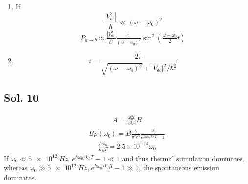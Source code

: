 \begin{enumerate}
\begin{align*}
               & =\frac{4\hbar^2}{|V_{ab}|^2}
              \left[\frac{-(\omega-\omega_0)^2}{4\omega_r} + \omega_r\right]^2
              \sin^2(\omega_r t) \\
               & =
              \frac{4\hbar^2}{|V_{ab}|^2}
              \left[\frac{4(\omega-\omega_0)^4}{16
                          [(\omega-\omega_0)^2 + |V_{ab}|^2/\hbar^2]} +
                  \frac{1}{4}
                  [(\omega-\omega_0)^2 + |V_{ab}|^2/\hbar^2]
                  -\frac{1}{2}(\omega-\omega_0)^2\right]
              \sin^2(\omega_r t)
              \\
               & =
              \frac{\hbar^2}{|V_{ab}|^2}
              \left[\frac{(\omega-\omega_0)^4}{
                      [(\omega-\omega_0)^2 + |V_{ab}|^2/\hbar^2]} +
                  |V_{ab}|^2/\hbar^2
                  -(\omega-\omega_0)^2\right]
              \sin^2(\omega_r t)
              \\
               & =
              \frac{|V_{ab}|^2/\hbar^2}{(\omega-\omega_0)^2 + |V_{ab}|^2/\hbar^2}
              \sin^2(\omega_r t)
          \end{align*}
          \begin{align*}
              |c_a|^2
               & =\frac{(\omega-\omega_0)^2}{4\omega_r^2}\sin^2(\omega_r t) + \cos^2(\omega_r t) \\
               & = \frac{(\omega-\omega_0)^2}
                   {(\omega-\omega_0)^2+|V_{ab}|^2/\hbar^2}\sin^2(\omega_r t) + \cos^2(\omega_r t)
          \end{align*}
    \item If $$
              \frac{|V_{ab}^2|}{\hbar} \ll (\omega-\omega_0)^2
          $$
          \begin{align*}
              P_{a\to b} \approx
              \frac{|V_{ab}^2|}{\hbar^2}
              \frac{1}{(\omega-\omega_0)^2}
              \sin^2\left(\frac{\omega-\omega_0}{2} t\right)
          \end{align*}
    \item
          $$
              t = \frac{2\pi}{\sqrt{(\omega-\omega_0)^2} + |V_{ab}|^2/\hbar^2}
          $$
\end{enumerate}


\subsection*{Sol. 10}
\begin{align*}
    A = \frac{\omega_0^3\hbar}{\pi^2c^3}B
\end{align*}
\begin{align*}
    B\rho(\omega_0) =B
    \frac{\hbar}{\pi^2 c^3}
    \frac{\omega_0^3}{e^{\hbar\omega_0/k_B T} - 1}
\end{align*}
\begin{align*}
    \frac{\hbar \omega_0}{k_B T} = 2.5\times 10^{-14}\omega_0
\end{align*}
If $\omega_0 \ll \qty{5e12}{Hz}$,
$
    e^{\hbar\omega_0/k_B T} - 1 \ll 1
$ and thus thermal stimulation dominates, whereas
$\omega_0 \gg \qty{5e12}{Hz}$,
$
    e^{\hbar\omega_0/k_B T} - 1 \gg 1
$,
the spontaneous emission dominates.


